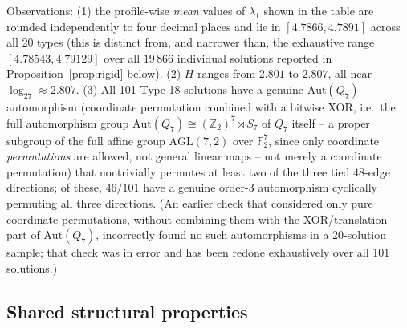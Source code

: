 \documentclass[12pt,a4paper]{article}
\theoremstyle{definition}
\begin{document}
Observations: (1) the profile-wise \emph{mean} values of $\lambda_1$ shown
in the table are rounded independently to four decimal places and lie in
$[4.7866,4.7891]$ across all 20 types (this is distinct from, and narrower than,
the exhaustive range
$[4.78543,4.79129]$ over all $19\,866$ individual solutions reported
in Proposition~\ref{prop:rigid} below).
(2) $H$ ranges from $2.801$ to $2.807$, all near $\log_27\approx2.807$.
(3) All 101 Type-18 solutions have a genuine $\mathrm{Aut}(Q_7)$-automorphism
(coordinate permutation combined with a bitwise XOR, i.e.\ the full
automorphism group $\mathrm{Aut}(Q_7)\cong(\mathbb{Z}_2)^7\rtimes S_7$
of $Q_7$ itself -- a proper subgroup of the full affine group
$\mathrm{AGL}(7,2)$ over $\mathbb{F}_2^7$, since only coordinate
\emph{permutations} are allowed, not general linear maps -- not
merely a coordinate permutation) that nontrivially permutes at least
two of the three tied $48$-edge directions; of these, $46/101$ have a
genuine order-$3$ automorphism cyclically permuting all three
directions. (An earlier check that considered only pure coordinate
permutations, without combining them with the XOR/translation part of
$\mathrm{Aut}(Q_7)$, incorrectly found no such automorphisms in a
20-solution sample; that check was in error and has been redone
exhaustively over all 101 solutions.)

\subsection{Shared structural properties}
\end{document}
